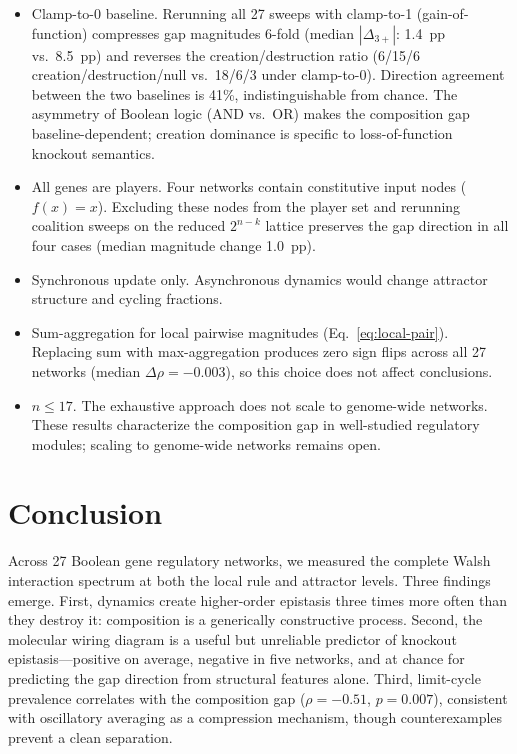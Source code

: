 \documentclass[10pt]{article}
\begin{document}
\begin{itemize}
\item Clamp-to-0 baseline. Rerunning all 27 sweeps with
  clamp-to-1 (gain-of-function) compresses gap magnitudes 6-fold
  (median $|\Delta_{3+}|$: 1.4~pp vs.\ 8.5~pp) and reverses the
  creation/destruction ratio (6/15/6 creation/destruction/null vs.\
  18/6/3 under clamp-to-0). Direction agreement between the two
  baselines is 41\%, indistinguishable from chance. The asymmetry of
  Boolean logic (AND vs.\ OR) makes the composition gap
  baseline-dependent; creation dominance is specific to
  loss-of-function knockout semantics.
\item All genes are players. Four networks contain constitutive
  input nodes ($f(x) = x$). Excluding these nodes from the player set
  and rerunning coalition sweeps on the reduced $2^{n-k}$ lattice
  preserves the gap direction in all four cases (median magnitude
  change 1.0~pp).
\item Synchronous update only. Asynchronous dynamics would change
  attractor structure and cycling fractions.
\item Sum-aggregation for local pairwise magnitudes
  (Eq.~\ref{eq:local-pair}). Replacing sum with max-aggregation
  produces zero sign flips across all 27 networks (median $\Delta\rho
  = -0.003$), so this choice does not affect conclusions.
\item $n \leq 17$. The exhaustive approach does not scale to
  genome-wide networks. These results characterize the composition
  gap in well-studied regulatory modules; scaling to genome-wide
  networks remains open.
\end{itemize}


\section{Conclusion}
\label{sec:conclusion}

Across 27 Boolean gene regulatory networks, we measured the complete
Walsh interaction spectrum at both the local rule and attractor
levels. Three findings emerge. First, dynamics create higher-order
epistasis three times more often than they destroy it: composition
is a generically constructive process. Second, the molecular wiring
diagram is a useful but unreliable predictor of knockout
epistasis---positive on average, negative in five networks, and at
chance for predicting the gap direction from structural features
alone. Third, limit-cycle prevalence correlates with the composition
gap ($\rho = -0.51$, $p = 0.007$), consistent with oscillatory
averaging as a compression mechanism, though counterexamples prevent
a clean separation.
\end{document}
